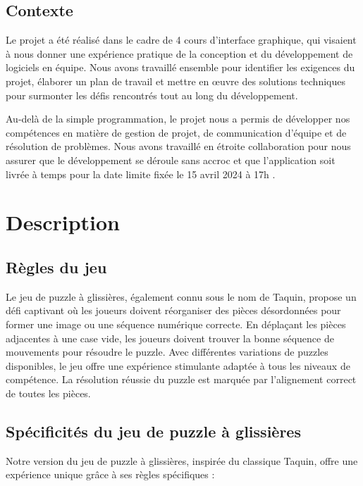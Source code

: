 \documentclass[a4paper,10pt]{article}
\begin{document}
\subsection{Contexte}
Le projet a été réalisé dans le cadre de 4 cours d'interface graphique, qui visaient à nous donner une expérience pratique de la conception et du développement de logiciels en équipe. Nous avons travaillé ensemble pour identifier les exigences du projet, élaborer un plan de travail et mettre en œuvre des solutions techniques pour surmonter les défis rencontrés tout au long du développement.

Au-delà de la simple programmation, le projet nous a permis de développer nos compétences en matière de gestion de projet, de communication d'équipe et de résolution de problèmes. Nous avons travaillé en étroite collaboration pour nous assurer que le développement se déroule sans accroc et que l'application soit livrée à temps pour la date limite fixée le 15 avril 2024 à 17h .


\section{Description}

\subsection{Règles du jeu}
Le jeu de puzzle à glissières, également connu sous le nom de Taquin, propose un défi captivant où les joueurs doivent réorganiser des pièces désordonnées pour former une image ou une séquence numérique correcte. En déplaçant les pièces adjacentes à une case vide, les joueurs doivent trouver la bonne séquence de mouvements pour résoudre le puzzle. Avec différentes variations de puzzles disponibles, le jeu offre une expérience stimulante adaptée à tous les niveaux de compétence. La résolution réussie du puzzle est marquée par l'alignement correct de toutes les pièces.

\subsection{Spécificités du jeu de puzzle à glissières}

Notre version du jeu de puzzle à glissières, inspirée du classique Taquin, offre une expérience unique grâce à ses règles spécifiques :
\end{document}
